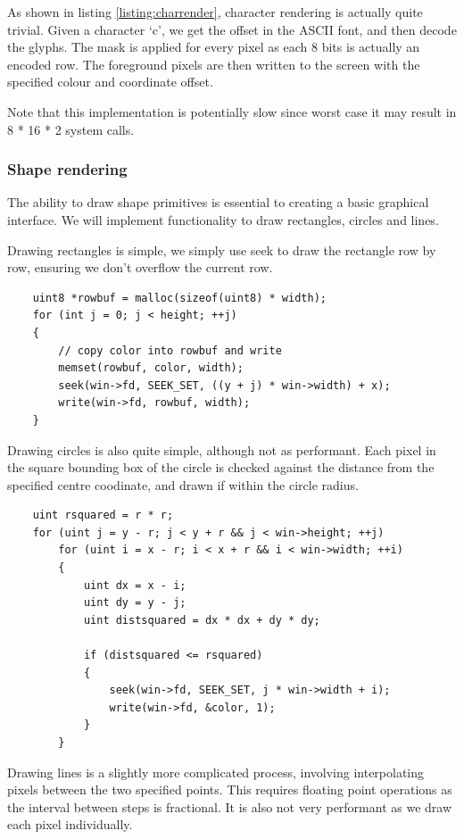 As shown in listing \ref{listing:charrender}, character rendering is actually 
quite trivial. Given a character `c', we get the offset in the ASCII font, and
then decode the glyphs. The mask is applied for every pixel as each 8 bits
is actually an encoded row. The foreground pixels are then written to the screen
with the specified colour and coordinate offset.

Note that this implementation is potentially slow since worst case it may result in 
8 * 16 * 2 system calls.

\subsubsection{Shape rendering}
The ability to draw shape primitives is essential to creating a basic graphical interface.
We will implement functionality to draw rectangles, circles and lines.

Drawing rectangles is simple, we simply use seek to draw the rectangle
row by row, ensuring we don't overflow the current row.

\begin{verbatim}
    uint8 *rowbuf = malloc(sizeof(uint8) * width);
    for (int j = 0; j < height; ++j)
    {
        // copy color into rowbuf and write
        memset(rowbuf, color, width);
        seek(win->fd, SEEK_SET, ((y + j) * win->width) + x);
        write(win->fd, rowbuf, width);
    }
\end{verbatim}

Drawing circles is also quite simple, although not as performant. Each pixel
in the square bounding box of the circle is checked against the distance
from the specified centre coodinate, and drawn if within the circle radius. 

\begin{verbatim}
    uint rsquared = r * r;
    for (uint j = y - r; j < y + r && j < win->height; ++j)
        for (uint i = x - r; i < x + r && i < win->width; ++i)
        {
            uint dx = x - i;
            uint dy = y - j;
            uint distsquared = dx * dx + dy * dy;

            if (distsquared <= rsquared)
            {
                seek(win->fd, SEEK_SET, j * win->width + i);
                write(win->fd, &color, 1);
            }
        }
\end{verbatim}

Drawing lines is a slightly more complicated process, involving interpolating
pixels between the two specified points. This requires floating point operations
as the interval between steps is fractional. It is also not very performant as
we draw each pixel individually.

